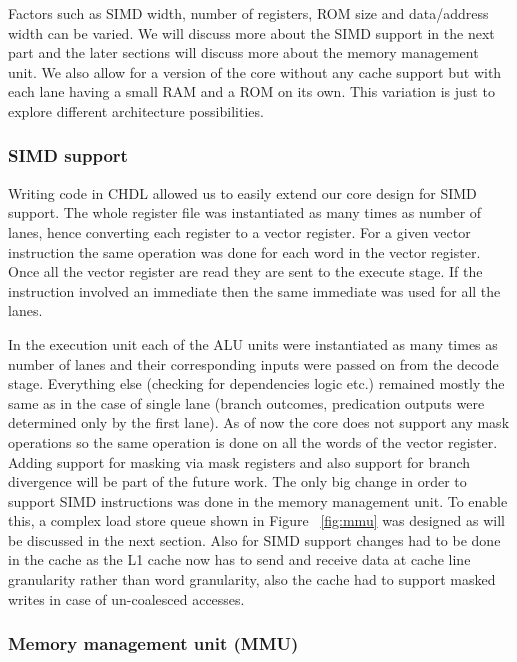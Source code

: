 Factors such as SIMD width, number of registers, ROM size and data/address width can be varied. We will discuss more about the SIMD support in the next part and the later sections will discuss more about the memory management unit. We also allow for a version of the core without any cache support but with each lane having a small RAM and a ROM on its own. This variation is just to explore different architecture possibilities.

\subsubsection {SIMD support}

Writing code in CHDL allowed us to easily extend our core design for SIMD support. The whole register file was instantiated as many times as number of lanes, hence converting each register to a vector register. For a given vector instruction the same operation was done for each word in the vector register. Once all the vector register are read they are sent to the execute stage. If the instruction involved an immediate then the same immediate was used for all the lanes.

In the execution unit each of the ALU units were instantiated as many times as number of lanes and their corresponding inputs were passed on from the decode stage. Everything else (checking for dependencies logic etc.) remained mostly the same as in the case of single lane (branch outcomes, predication outputs were determined only by the first lane). As of now the core does not support any mask operations so the same operation is done on all the words of the vector register. Adding support for masking via mask registers and also support for branch divergence will be part of the future work. The only big change in order to support SIMD instructions was done in the memory management unit. To enable this, a complex load store queue shown in Figure ~\ref{fig:mmu} was designed as will be discussed in the next section. Also for SIMD support changes had to be done in the cache as the L1 cache now has to send and receive data at cache line granularity rather than word granularity, also the cache had to support masked writes in case of un-coalesced accesses.

\subsubsection {Memory management unit (MMU)}

